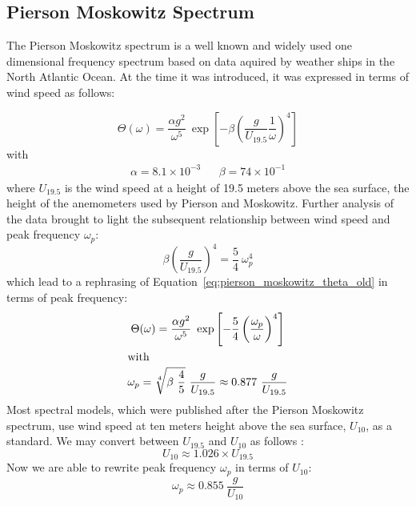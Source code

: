 \subsection{Pierson Moskowitz Spectrum}
\label{sec:pierson_moskowitz}
%
The Pierson Moskowitz spectrum \citep{article:PiersonMoskowitz1964} is a well 
known and widely used one dimensional frequency spectrum based on data aquired 
by weather ships in the North Atlantic Ocean. At the time it was introduced, 
it was expressed in terms of wind speed as follows:

\begin{equation}
\label{eq:pierson_moskowitz_theta_old}
 \Theta(\omega) = \frac{\alpha
g^2}{\omega^5}~\exp\left[-\beta\left(\frac{g}{U_{19.5}}\frac{1}{\omega}
\right)^4\right ]
\end{equation}
with
\begin{align*}
\alpha = 8.1 \times 10^{-3} && \beta = 74 \times 10^{-1}
\end{align*}
where $U_{19.5}$ is the wind speed at a height of 19.5 meters above the sea
surface, the height of the anemometers used by Pierson and Moskowitz. Further
analysis of the data \citep{alves:2003} brought to light the subsequent
relationship between wind speed and peak frequency $\omega_p$:
\begin{equation*}
 \beta\left(\frac{g}{U_{19.5}}\right)^4 = \frac{5}{4}~\omega_p^4
\end{equation*}
which lead to a rephrasing of Equation~\ref{eq:pierson_moskowitz_theta_old} in 
terms of peak frequency:
\begin{gather}
 \Theta(\omega) = \frac{\alpha
g^2}{\omega^5}~\exp\left[-\frac{5}{4}\left(\frac{\omega_p}{\omega}
\right)^4\right ] \label{eq:pierson_moskowitz_theta}\\
\intertext{with}
\omega_p = \sqrt[4]{\beta~\frac{4}{5}}~\frac{g}{U_{19.5}} \approx
0.877~\frac{g}{U_{19.5}}
\end{gather}
Most spectral models, which were published after the Pierson Moskowitz spectrum,
use wind speed at ten meters height above the sea surface, $U_{10}$, as a 
standard. We may convert between $U_{19.5}$ and $U_{10}$ as follows
\citep{alves:2003}:
\begin{equation}
 U_{10} \approx 1.026\times U_{19.5}
\end{equation}
Now we are able to rewrite peak frequency $\omega_p$ in terms of $U_{10}$:
\begin{equation}
\label{eq:pm_omega_p_u10}
 \omega_p \approx 0.855~\frac{g}{U_{10}}
\end{equation}
